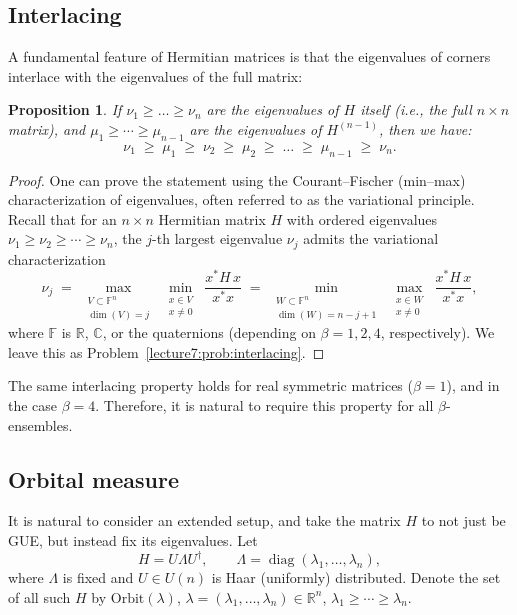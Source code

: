 \documentclass[letterpaper,11pt,oneside,reqno]{book}
\numberwithin{equation}{chapter}  %
\newtheorem{proposition}{Proposition}[chapter]  %
\theoremstyle{definition}
\begin{document}
\subsection{Interlacing}
A fundamental feature of Hermitian matrices is that the eigenvalues of corners interlace with the eigenvalues of the full matrix:
\begin{proposition}
	\label{lecture7:prop:interlacing}
If $\nu_1\ge\dots\ge \nu_n$ are the eigenvalues of $H$ itself (i.e., the full $n\times n$ matrix), and $\mu_1\ge\cdots\ge\mu_{n-1}$ are the eigenvalues of $H^{(n-1)}$, then we have:
\[
\nu_1\;\ge\;\mu_1\;\ge\;\nu_2\;\ge\;\mu_2\;\ge\;\dots\;\ge\;\mu_{n-1}\;\ge\;\nu_n.
\]
\end{proposition}
\begin{proof}
One can prove the statement using the Courant--Fischer
(min--max) characterization of eigenvalues, often referred
to as the variational principle. Recall that for an
\(n\times n\) Hermitian matrix \(H\) with ordered
eigenvalues \(\nu_1 \ge \nu_2 \ge \cdots \ge \nu_n\), the
\(j\)-th largest eigenvalue \(\nu_j\) admits the variational
characterization
\[
\nu_j
\;=\;
\max_{\substack{V\subset\mathbb{F}^n\\\dim(V)=j}}
\;\min_{\substack{x\in V \\ x\neq 0}}
\;
\frac{x^\ast H\,x}{x^\ast x}
\;=\;
\min_{\substack{W\subset\mathbb{F}^n\\\dim(W)=n-j+1}}
\;\max_{\substack{x\in W \\ x\neq 0}}
\;
\frac{x^\ast H\,x}{x^\ast x},
\]
where \(\mathbb{F}\) is \(\mathbb{R}\), \(\mathbb{C}\), or
the quaternions (depending on \(\beta=1,2,4\),
respectively).
We leave this as Problem~\ref{lecture7:prob:interlacing}.
\end{proof}

The same interlacing property holds for real symmetric matrices ($\beta=1$),
and in the case $\beta=4$.
Therefore, it is natural to require this property for all $\beta$-ensembles.

\subsection{Orbital measure}

It is natural to consider an extended setup, and
take the matrix $H$ to not just be GUE, but instead fix its eigenvalues.
Let
\begin{equation*}
	H=U\Lambda U^\dagger,\qquad \Lambda=\operatorname{diag}(\lambda_1,\dots,\lambda_n),
\end{equation*}
where $\Lambda$ is fixed and $U\in U(n)$ is Haar (uniformly) distributed.
Denote the set of all such $H$
by $\mathrm{Orbit}(\lambda)$, $\lambda=(\lambda_1,\dots,\lambda_n)\in \mathbb{R}^n$,
$\lambda_1\ge \cdots\ge \lambda_n$.
\end{document}

